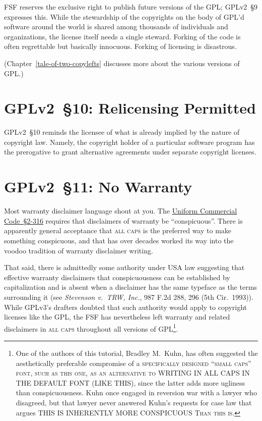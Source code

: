 FSF reserves the exclusive right to publish future versions of the GPL\@;
GPLv2~\S9 expresses this.  While the stewardship of the copyrights on the body
of GPL'd software around the world is shared among thousands of
individuals and organizations, the license itself needs a single steward.
Forking of the code is often regrettable but basically innocuous.  Forking
of licensing is disastrous.

(Chapter~\ref{tale-of-two-copylefts} discusses more about the various
versions of GPL.)

\section{GPLv2~\S10: Relicensing Permitted}
\label{GPLv2s10}

GPLv2~\S10 reminds the licensee of what is already implied by the nature of
copyright law.  Namely, the copyright holder of a particular software
program has the prerogative to grant alternative agreements under separate
copyright licenses.

\section{GPLv2~\S11: No Warranty}
\label{GPLv2s11}

Most warranty disclaimer language shout at you.  The
\href{http://www.law.cornell.edu/ucc/2/2-316}{Uniform Commercial
  Code~\S2-316} requires that disclaimers of warranty be ``conspicuous''.
There is apparently general acceptance that \textsc{all caps} is the
preferred way to make something conspicuous, and that has over decades worked
its way into the voodoo tradition of warranty disclaimer writing.

That said, there is admittedly some authority under USA law suggesting that
effective warranty disclaimers that conspicuousness can be established by
capitalization and is absent when a disclaimer has the same typeface as the
terms surrounding it (see \textit{Stevenson v.~TRW, Inc.}, 987 F.2d 288, 296
(5th Cir.~1993)).  While GPLv3's drafters doubted that such authority would
apply to copyright licenses like the GPL, the FSF has nevertheless left
warranty and related disclaimers in \textsc{all caps} throughout all versions
of GPL\@\footnote{One of the authors of this tutorial, Bradley M.~Kuhn, has
  often suggested the aesthetically preferable compromise of a
  \textsc{specifically designed ``small caps'' font, such as this one, as an
    alternative to} WRITING IN ALL CAPS IN THE DEFAULT FONT (LIKE THIS),
  since the latter adds more ugliness than conspicuousness.  Kuhn once
  engaged in reversion war with a lawyer who disagreed, but that lawyer never
  answered Kuhn's requests for case law that argues THIS IS INHERENTLY MORE
  CONSPICUOUS \textsc{Than this is}.}.

